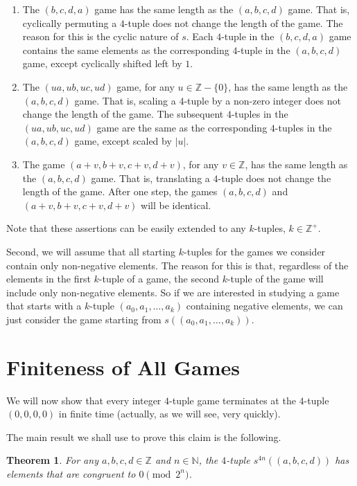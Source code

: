 \documentclass[12pt]{amsart}
\newtheorem{theorem}{Theorem}[section]
\newcommand{\z}{\mathbb{Z}}
\newcommand{\diff}{s}
\newcommand{\znn}{\mathbb{N}}
\newcommand{\zp}{\mathbb{Z}^+}
\begin{document}
\begin{enumerate}
\item The $(b,c,d,a)$ game has the same length as the $(a,b,c,d)$ game. That is, cyclically permuting a $4$-tuple does not change the length of the game. The reason for this is the cyclic nature of $\diff$. Each $4$-tuple in the $(b,c,d,a)$ game contains the same elements as the corresponding $4$-tuple in the $(a,b,c,d)$ game, except cyclically shifted left by $1$. \\
\item The $(ua, ub, uc, ud)$ game, for any $u \in \z - \{0\}$, has the same length as the $(a,b,c,d)$ game. That is, scaling a $4$-tuple by a non-zero integer does not change the length of the game. The subsequent $4$-tuples in the $(ua, ub, uc, ud)$ game are the same as the corresponding $4$-tuples in the $(a,b,c,d)$ game, except scaled by $|u|$. \\
\item The game $(a + v, b + v, c + v, d + v)$, for any $v \in \z$, has the same length as the $(a,b,c,d)$ game. That is, translating a $4$-tuple does not change the length of the game. After one step, the games $(a, b, c, d)$ and $(a + v, b + v, c + v, d + v)$ will be identical.
\end{enumerate}

Note that these assertions can be easily extended to any $k$-tuples, $k \in \zp$.

Second, we will assume that all starting $k$-tuples for the games we consider contain only non-negative elements. The reason for this is that, regardless of the elements in the first $k$-tuple of a game, the second $k$-tuple of the game will include only non-negative elements. So if we are interested in studying a game that starts with a $k$-tuple $(a_0, a_1, \dots, a_k)$ containing negative elements, we can just consider the game starting from $\diff((a_0, a_1, \dots, a_k))$.

\section{Finiteness of All Games\label{sec:convergence}}

We will now show that every integer $4$-tuple game terminates at the $4$-tuple $(0,0,0,0)$ in finite time (actually, as we will see, very quickly).

The main result we shall use to prove this claim is the following.
\begin{theorem}
For any $a,b,c,d \in \z$ and $n \in \znn$, the $4$-tuple $\diff^{4n}((a, b, c, d))$ has elements that are congruent to $0\pmod{2^n}$.
\label{thm:pow2}
\end{theorem}
\end{document}
